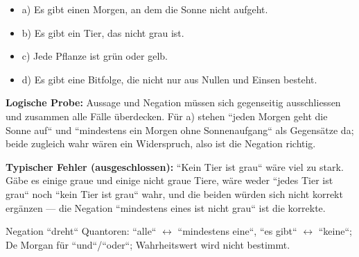 \begin{ergebnis}
\begin{itemize}
  \item a) Es gibt einen Morgen, an dem die Sonne nicht aufgeht.
  \item b) Es gibt ein Tier, das nicht grau ist.
  \item c) Jede Pflanze ist grün oder gelb.
  \item d) Es gibt eine Bitfolge, die nicht nur aus Nullen und Einsen besteht.
\end{itemize}
\end{ergebnis}

\begin{kontrolle}
\textbf{Logische Probe:} Aussage und Negation müssen sich gegenseitig
ausschliessen und zusammen alle Fälle überdecken. Für a) stehen
``jeden Morgen geht die Sonne auf`` und ``mindestens ein Morgen ohne
Sonnenaufgang`` als Gegensätze da; beide zugleich wahr wären ein
Widerspruch, also ist die Negation richtig.

\textbf{Typischer Fehler (ausgeschlossen):} ``Kein Tier ist grau`` wäre
viel zu stark. Gäbe es einige graue und einige nicht graue Tiere, wäre
weder ``jedes Tier ist grau`` noch ``kein Tier ist grau`` wahr, und die
beiden würden sich nicht korrekt ergänzen --- die Negation
``mindestens eines ist nicht grau`` ist die korrekte.
\end{kontrolle}

\begin{merksatz}
Negation ``dreht`` Quantoren: ``alle`` $\leftrightarrow$ ``mindestens
eine``, ``es gibt`` $\leftrightarrow$ ``keine``; De Morgan für
``und``/``oder``; Wahrheitswert wird nicht bestimmt.
\end{merksatz}
